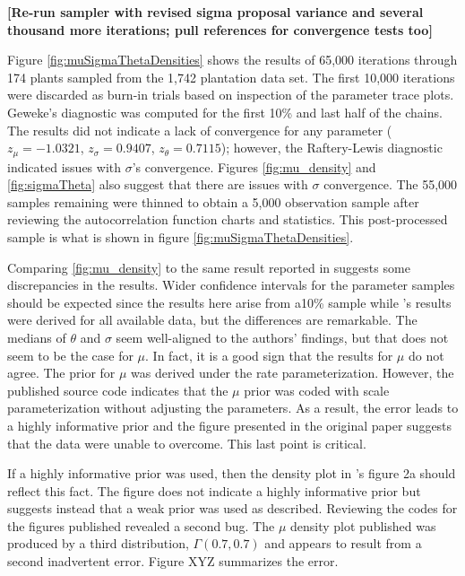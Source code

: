 \documentclass{uwstat572}
\begin{document}
\textbf{[Re-run sampler with revised sigma proposal variance and several thousand more iterations; pull references for convergence tests too]}

Figure \ref{fig:muSigmaThetaDensities} shows the results of 65,000 iterations through 174 plants sampled from the 1,742 plantation data set. 
The first 10,000 iterations were discarded as burn-in trials based on inspection of the parameter trace plots. 
Geweke's diagnostic was computed for the first 10\% and last half of the chains. 
The results did not indicate a lack of convergence for any parameter ($z_{\mu} = -1.0321$, $z_{\sigma} = 0.9407$,  $z_{\theta} = 0.7115$); however, the Raftery-Lewis diagnostic indicated issues with $\sigma$'s convergence. 
Figures \ref{fig:mu_density} and \ref{fig:sigmaTheta} also suggest that there are issues with $\sigma$ convergence. 
The 55,000 samples remaining were thinned to obtain a 5,000 observation sample after reviewing the autocorrelation function charts and statistics. 
This post-processed sample is what is shown in figure \ref{fig:muSigmaThetaDensities}. 

Comparing \ref{fig:mu_density} to the same result reported in \citet{Brown} suggests some discrepancies in the results. 
Wider confidence intervals for the parameter samples should be expected since the results here arise from a10\% sample while \cite{Brown}'s results were derived for all available data, but the differences are remarkable. 
The medians of $\theta$ and $\sigma$ seem well-aligned to the authors' findings, but that does not seem to be the case for $\mu$. 
In fact, it is a good sign that the results for $\mu$ do not agree. 
The prior for $\mu$ was derived under the rate parameterization. 
However, the published source code indicates that the $\mu$ prior was coded with scale parameterization without adjusting the parameters.
As a result, the error leads to a highly informative prior and the figure presented in the original paper suggests that the data were unable to overcome. 
This last point is critical. 

If a highly informative prior was used, then the density plot in \citet{Brown}'s figure 2a should reflect this fact. 
The figure does not indicate a highly informative prior but suggests instead that a weak prior was used as described. 
Reviewing the codes for the figures published revealed a second bug. 
The  $\mu$ density plot published was produced by a third distribution, $\Gamma(0.7, 0.7)$ and appears to result from a second inadvertent error. 
Figure XYZ summarizes the error. 
\end{document}
